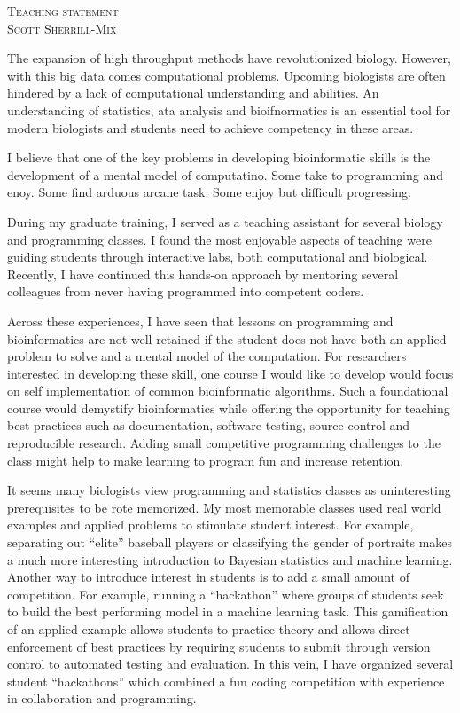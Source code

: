 \documentclass[12pt]{article}
\date{\today}
\begin{document}

\begin{center}
\fontsize{19}{21}\textsc{Teaching statement}\\
\vspace{.4em}
\fontsize{14}{17}\textsc{Scott Sherrill-Mix}
\end{center}

The expansion of high throughput methods have revolutionized biology. However, with this big data comes computational problems. Upcoming biologists are often hindered by a lack of computational understanding and abilities. An understanding of statistics, ata analysis and bioifnormatics is an essential tool for modern biologists and students need to achieve competency in these areas. 


I believe that one of the key problems in developing bioinformatic skills is the development of a mental model of computatino. Some take to programming and enoy. Some find arduous arcane task. Some enjoy but difficult progressing.

During my graduate training, I served as a teaching assistant for several biology and programming classes. I found the most enjoyable aspects of teaching were guiding students through interactive labs, both computational and biological. Recently, I have continued this hands-on approach by mentoring several colleagues from never having programmed into competent coders. 
 
Across these experiences, I have seen that lessons on programming and bioinformatics are not well retained if the student does not have both an applied problem to solve and a mental model of the computation.  For researchers interested in developing these skill, one course I would like to develop would focus on self implementation of common bioinformatic algorithms. Such a foundational course would demystify bioinformatics while offering the opportunity for teaching best practices such as documentation, software testing, source control and reproducible research. Adding small competitive programming challenges to the class might help to make learning to program fun and increase retention.

  It seems many biologists view programming and statistics classes as uninteresting prerequisites to be rote memorized. My most memorable classes used real world examples and applied problems to stimulate student interest. For example, separating out ``elite'' baseball players or classifying the gender of portraits makes a much more interesting introduction to Bayesian statistics and machine learning.   Another way to introduce interest in students is to add a small amount of competition. For example, running a ``hackathon'' where groups of students seek to build the best performing model in a machine learning task. This gamification of an applied example allows students to practice theory and allows direct enforcement of best practices by requiring students to submit through version control to automated testing and evaluation. In this vein, I have organized several student ``hackathons'' which combined a fun coding competition with experience in collaboration and programming.
\end{document}
